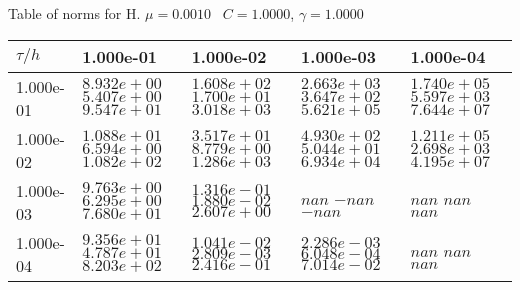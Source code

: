 \begin{center}
Table of norms for H. $\mu = 0.0010$ \, $C = 1.0000$, $\gamma = 1.0000$
  
\begin{tabular}{|p{1in}|p{1in}|p{1in}|p{1in}|p{1in}|} \hline
$\tau / h$ &1.000e-01 &1.000e-02 &1.000e-03 &1.000e-04 \\ \hline 
1.000e-01 & $8.932e+00$  $5.407e+00$  $9.547e+01$  & $1.608e+02$  $1.700e+01$  $3.018e+03$  & $2.663e+03$  $3.647e+02$  $5.621e+05$  & $1.740e+05$  $5.597e+03$  $7.644e+07$  \\ \hline 
1.000e-02 & $1.088e+01$  $6.594e+00$  $1.082e+02$  & $3.517e+01$  $8.779e+00$  $1.286e+03$  & $4.930e+02$  $5.044e+01$  $6.934e+04$  & $1.211e+05$  $2.698e+03$  $4.195e+07$  \\ \hline 
1.000e-03 & $9.763e+00$  $6.295e+00$  $7.680e+01$  & $1.316e-01$  $1.880e-02$  $2.607e+00$  & $nan$  $-nan$  $-nan$  & $nan$  $nan$  $nan$  \\ \hline 
1.000e-04 & $9.356e+01$  $4.787e+01$  $8.203e+02$  & $1.041e-02$  $2.809e-03$  $2.416e-01$  & $2.286e-03$  $6.048e-04$  $7.014e-02$  & $nan$  $nan$  $nan$  \\ \hline 

\end{tabular}\\[20pt]
\end{center}
